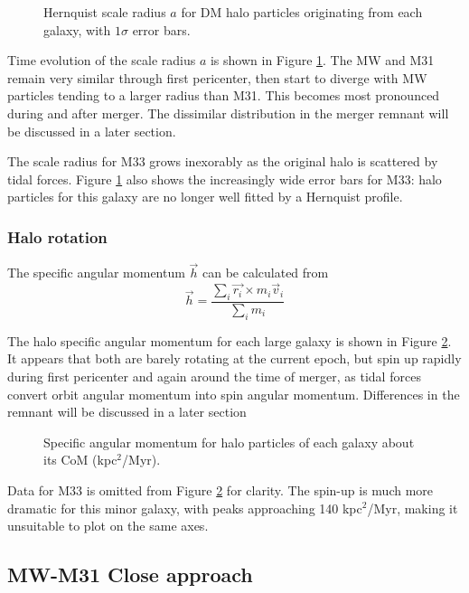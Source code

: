 \documentclass[twocolumn]{aastex63}
\newcommand{\todo}{\color{red}{TODO}\color{black}\hspace{2mm}}
\begin{document}
\begin{figure}[htb!]
	\caption{Hernquist scale radius $a$ for DM halo particles originating from each galaxy, with $1\sigma$ error bars.
		\label{fig:hernquist_a}}
\end{figure}

Time evolution of the scale radius $a$ is shown in Figure \ref{fig:hernquist_a}. The MW and M31 remain very similar through first pericenter, then start to diverge with MW particles tending to a larger radius than M31. This becomes most pronounced during and after merger. The dissimilar distribution in the merger remnant will be discussed in a later section.  

The scale radius for M33 grows inexorably as the original halo is scattered by tidal forces. Figure \ref{fig:hernquist_a} also shows the increasingly wide error bars for M33: halo particles for this galaxy are no longer well fitted by a Hernquist profile.

\subsubsection{Halo rotation}

The specific angular momentum $\vec{h}$ can be calculated from
\[ \vec{h} = \frac{\sum_i{\vec{r_i} \times m_i \vec{v}_i}}{\sum_i{m_i}} \]

The halo specific angular momentum for each large galaxy is shown in Figure \ref{fig:halo_h}. It appears that both are barely rotating at the current epoch, but spin up rapidly during first pericenter and again around the time of merger, as tidal forces convert orbit angular momentum into spin angular momentum. Differences in the remnant will be discussed in a later section

\begin{figure}[htb!]
	\caption{Specific angular momentum for halo particles of each galaxy about its CoM (kpc$^2$/Myr).
		\label{fig:halo_h}}
\end{figure}

Data for M33 is omitted from Figure \ref{fig:halo_h} for clarity. The spin-up is much more dramatic for this minor galaxy, with peaks approaching 140 kpc$^2$/Myr, making it unsuitable to plot on the same axes.

\todo{effect of radius}

\subsection{MW-M31 Close approach}
\end{document}
